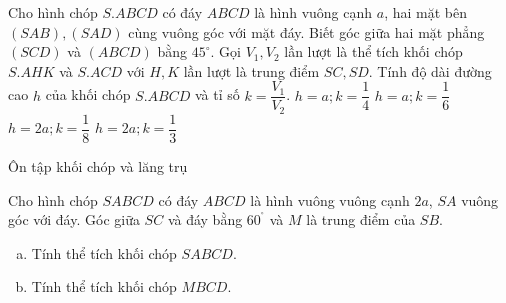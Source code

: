 \begin{ex}%
	Cho hình chóp $S.ABCD$ có đáy $ABCD$ là hình vuông cạnh $a$, hai mặt bên $(SAB),(SAD)$ cùng vuông góc với mặt đáy. Biết góc giữa hai mặt phẳng $(SCD)$ và $(ABCD)$ bằng $45^\circ$. Gọi $V_1,V_2$ lần lượt là thể tích khối chóp $S.AHK$ và $S.ACD$ với $H,K$ lần lượt là trung điểm $SC,SD$. Tính độ dài đường cao $h$ của khối chóp $S.ABCD$ và tỉ số $k=\dfrac{V_1}{V_2}$. 
	\choice
	{\True $h=a;k=\dfrac{1}{4}$}
	{$h=a;k=\dfrac{1}{6}$}
	{$h=2a;k=\dfrac{1}{8}$}
	{$h=2a;k=\dfrac{1}{3}$}
\end{ex}


\begin{dang}{Ôn tập khối chóp và lăng trụ}
\end{dang}
\begin{vd}%
	Cho hình chóp $SABCD$ có đáy $ABCD$ là hình vuông vuông cạnh $2a$, $SA$ vuông góc với đáy. Góc giữa $SC$ và đáy bằng $60^{^{\circ}}$ và $M$ là trung điểm của $SB$.
	\begin{enumerate}[a)]
		\item Tính thể tích khối chóp $SABCD$.
		\item Tính thể tích khối chóp $MBCD$.
	\end{enumerate}
\end{vd}

